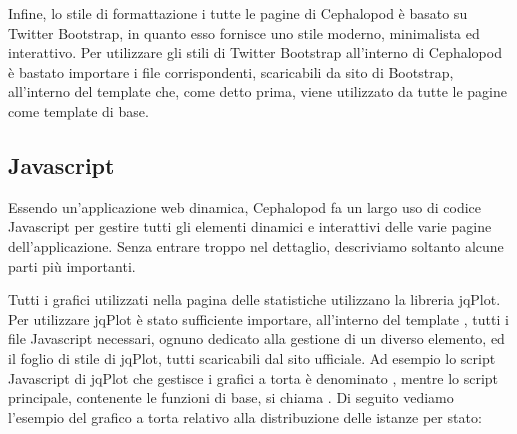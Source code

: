             Infine, lo stile di formattazione i tutte le pagine di Cephalopod è basato su Twitter Bootstrap, in quanto esso fornisce uno stile moderno, minimalista ed interattivo. Per utilizzare gli stili di Twitter Bootstrap all'interno di Cephalopod è bastato importare i file corrispondenti, scaricabili da sito di Bootstrap, all'interno del template  che, come detto prima, viene utilizzato da tutte le pagine come template di base.
            
        \subsection{Javascript} \label{subsec:it;di;javascript}
        
            Essendo un'applicazione web dinamica, Cephalopod fa un largo uso di codice Javascript per gestire tutti gli elementi dinamici e interattivi delle varie pagine dell'applicazione. Senza entrare troppo nel dettaglio, descriviamo soltanto alcune parti più importanti.
            
            Tutti i grafici utilizzati nella pagina delle statistiche utilizzano la libreria jqPlot. Per utilizzare jqPlot è stato sufficiente importare, all'interno del template , tutti i file Javascript necessari, ognuno dedicato alla gestione di un diverso elemento, ed il foglio di stile  di jqPlot, tutti scaricabili dal sito ufficiale. Ad esempio lo script Javascript di jqPlot che gestisce i grafici a torta è denominato , mentre lo script principale, contenente le funzioni di base, si chiama . Di seguito vediamo l'esempio del grafico a torta relativo alla distribuzione delle istanze per stato:
            
